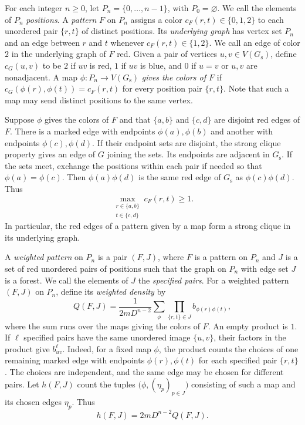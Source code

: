 \documentclass[preprint,11pt,numbers]{elsarticle-arxiv}
\numberwithin{equation}{section}
\theoremstyle{definition}
\begin{document}
For each integer $n\geq0$, let $P_n=\{0,\ldots,n-1\}$, with
$P_0=\varnothing$. We call the elements of $P_n$ \emph{positions}.
A \emph{pattern} $F$ on $P_n$ assigns a color
$c_F(r,t)\in\{0,1,2\}$ to each unordered pair $\{r,t\}$ of distinct
positions. Its \emph{underlying graph} has vertex set $P_n$ and an edge
between $r$ and $t$ whenever $c_F(r,t)\in\{1,2\}$. We call an edge of
color $2$ in the underlying graph of $F$ red. Given a pair of vertices
$u,v\in V(G_{\mathrm s})$, define $c_G(u,v)$ to be $2$ if $uv$ is red,
$1$ if $uv$ is blue, and $0$ if $u=v$ or $u,v$ are nonadjacent. A map
$\phi\colon P_n\to V(G_{\mathrm s})$ \emph{gives the colors of $F$} if
$c_G(\phi(r),\phi(t))=c_F(r,t)$ for every position pair $\{r,t\}$.
Note that such a map may send distinct positions to the same vertex.

Suppose $\phi$ gives the colors of $F$ and that $\{a,b\}$ and
$\{c,d\}$ are disjoint red edges of $F$. There is a marked edge with
endpoints $\phi(a),\phi(b)$ and another with endpoints
$\phi(c),\phi(d)$. If their endpoint sets are disjoint, the strong
clique property gives an edge of $G$ joining the sets. Its endpoints
are adjacent in $G_{\mathrm s}$. If the sets meet, exchange the
positions within each pair if needed so that $\phi(a)=\phi(c)$.
Then $\phi(a)\phi(d)$ is the same red edge of $G_{\mathrm s}$ as
$\phi(c)\phi(d)$. Thus
\begin{equation}\label{eq:weighted-joining-edge}
 \max_{\substack{r\in\{a,b\}\\t\in\{c,d\}}}c_F(r,t)\geq1.
\end{equation}
In particular, the red edges of a pattern given by a map form a
strong clique in its underlying graph.

A \emph{weighted pattern} on $P_n$ is a pair $(F,J)$, where $F$ is a
pattern on $P_n$ and $J$ is a set of red unordered pairs of positions
such that the graph on $P_n$ with edge set $J$ is a forest. We call the
elements of $J$ the \emph{specified pairs}. For a weighted pattern
$(F,J)$ on $P_n$, define its \emph{weighted density} by
\begin{equation}\label{eq:weighted-density}
 Q(F,J)=\frac{1}{2mD^{n-2}}\sum_{\phi}
             \prod_{\{r,t\}\in J} b_{\phi(r)\phi(t)},
\end{equation}
where the sum runs over the maps giving the colors of $F$. An empty
product is $1$. If $\ell$ specified pairs have the same unordered
image $\{u,v\}$, their factors in the product give $b_{uv}^{\ell}$.
Indeed, for a fixed map $\phi$, the product counts the choices of
one remaining marked edge with endpoints $\phi(r),\phi(t)$ for
each specified pair $\{r,t\}$. The choices are independent, and the
same edge may be chosen for different pairs. Let $h(F,J)$ count the
tuples $\bigl(\phi,(\eta_p)_{p\in J}\bigr)$ consisting of such a map
and its chosen edges $\eta_p$. Thus
\begin{equation}\label{eq:weighted-raw-count}
 h(F,J)=2mD^{n-2}Q(F,J).
\end{equation}
\end{document}
